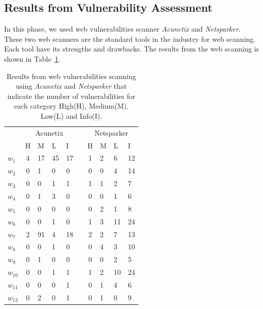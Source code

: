 \documentclass[conference]{IEEEtran}
\begin{document}
\subsection{Results from Vulnerability Assessment}

In this phase, we used web vulnerabilities scanner \emph{Acunetix} and
\emph{Netsparker}. These two web scanners are the standard tools in
the industry for web scanning. Each tool have its strengths and
drawbacks. The results from the web scanning is shown in
Table~\ref{tab:vuln}.





\begin{table}[thbp]
  \caption{Results from web vulnerabilities scanning using
    \emph{Acunetix} and \emph{Netsparker} that indicate the number of
    vulnerabilities for each category High(H), Medium(M), Low(L) and
    Info(I).}
	\label{tab:vuln}
	\centering
	\begin{tabular}{lcllllclll}
          & \multicolumn{4}{c}{Acunetix} &  & \multicolumn{4}{c}{Netsparker} \\ \cline{2-5} \cline{7-10} 
          & H & M & L & I &  & H & M & L & I \\ \cline{2-5} \cline{7-10} 
          $w_1$ & 4 & 17 & 45 & 17 &  & 1 & 2 & 6 & 12 \\
          $w_2$ & 0 & 1 & 0 & 0 &  & 0 & 0 & 4 & 14 \\
          $w_3$ & 0 & 0 & 1 & 1 &  & 1 & 1 & 2 & 7 \\
          $w_4$ & 0 & 1 & 3 & 0 &  & 0 & 0 & 1 & 6 \\
          $w_5$ & 0 & 0 & 0 & 0 &  & 0 & 2 & 1 & 8 \\
          $w_6$ & 0 & 0 & 1 & 0 &  & 1 & 3 & 11 & 24 \\
          $w_7$ & 2 & 91 & 4 & 18 &  & 2 & 2 & 7 & 13 \\
          $w_8$ & 0 & 0 & 1 & 0 &  & 0 & 4 & 3 & 10 \\
          $w_9$ & 0 & 1 & 0 & 0 &  & 0 & 0 & 2 & 5 \\
          $w_{10}$ & 0 & 0 & 1 & 1 &  & 1 & 2 & 10 & 24 \\
          $w_{11}$ & 0 & 0 & 0 & 1 &  & 0 & 1 & 4 & 6 \\
          $w_{12}$ & 0 & 2 & 0 & 1 &  & 0 & 1 & 0 & 9 \\

\end{tabular}
\end{table}
\end{document}
